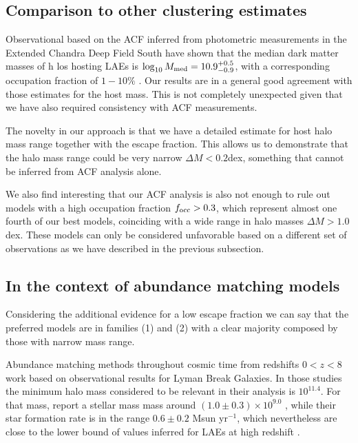 \documentclass[usenatbib]{mn2e}
\newcommand{\hMsun}{{\ifmmode{h^{-1}{\rm
        {M_{\odot}}}}\else{$h^{-1}{\rm{M_{\odot}}}$}\fi}}
\newcommand{\Msun}{{\ifmmode{{\rm {M_{\odot}}}}\else{${\rm{M_{\odot}}}$}\fi}}
\begin{document}
\subsection{Comparison to other clustering estimates}

Observational based on the ACF inferred from photometric measurements
in the Extended Chandra Deep Field South have shown that the median
dark matter masses of h los hosting LAEs is $\log_{10}M_{\rm
  med}=10.9^{+0.5}_{-0.9}$\Msun, with a corresponding occupation
fraction of $1-10\%$  \citep{Gawiser07}.  Our results are in a general
good agreement with those estimates for the host mass. This is not
completely unexpected given that we have also required consistency
with ACF measurements.   

The novelty in our approach is that we have a detailed estimate for 
host halo mass range together with the escape fraction. This allows us
to demonstrate that the halo mass range could be very narrow $\Delta M <
0.2$dex, something that cannot be inferred from ACF analysis
alone. 

We also find interesting that our ACF analysis is also not enough to rule
out models with a high occupation fraction $f_{\rm occ}>0.3$, which
represent almost one fourth of our best models, coinciding with a wide
range in halo masses $\Delta M>1.0$ dex. These models can only be
considered unfavorable based on a different set of observations as we
have described in the previous subsection.


\subsection{In the context of abundance matching models}


Considering the additional evidence for a low escape fraction we can
say that the preferred models are in families (1) and (2) with a
clear majority composed by those with narrow mass range.

Abundance matching methods throughout cosmic time from redshifts
$0<z<8$ \cite{Behroozi2013a,Behroozi2013b} work based on observational
results for Lyman Break Galaxies. In those studies the minimum halo
mass considered to be relevant in their analysis is
$10^{11.4}$\hMsun. For that mass, \cite{Behroozi2013a} report a
stellar mass mass around $(1.0\pm0.3)\times 10^{9.0}$
\hMsun, while their star formation rate is in the range $0.6\pm 0.2$
Msun yr$^{-1}$, which nevertheless are close to the lower bound of
values inferred for LAEs at high redshift
\citep{Gawiser2007,Nilsson2009,Pentericci2009}.  
\end{document}

